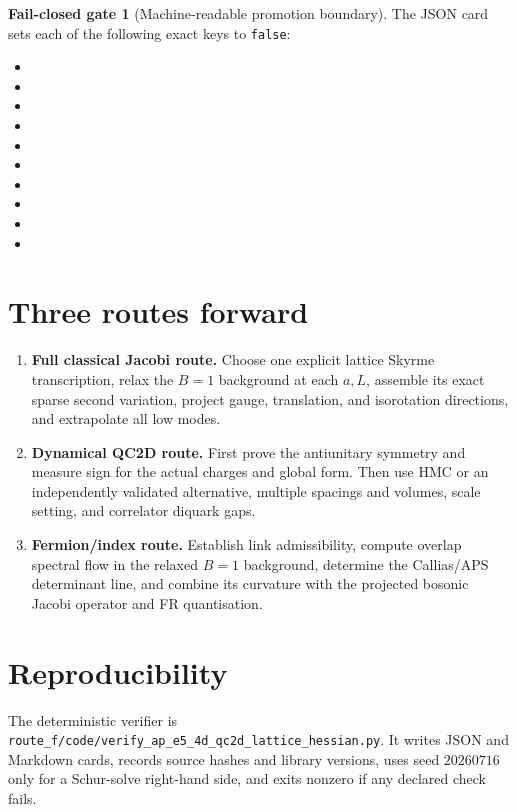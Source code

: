 \documentclass[11pt]{article}
\theoremstyle{definition}
\newtheorem{gate}[proposition]{Fail-closed gate}
\theoremstyle{remark}
\begin{document}
\begin{gate}[Machine-readable promotion boundary]
The JSON card sets each of the following exact keys to \texttt{false}:
\begin{itemize}[leftmargin=1.2em,itemsep=0pt,topsep=2pt]
\item {}
\item {}
\item {}
\item {}
\item {}
\item {}
\item {}
\item {}
\item {}
\item {}
\end{itemize}
\end{gate}

\section{Three routes forward}

\begin{enumerate}[label=(R\arabic*)]
\item \textbf{Full classical Jacobi route.}
Choose one explicit lattice Skyrme transcription, relax the \(B=1\)
background at each \(a,L\), assemble its exact sparse second variation,
project gauge, translation, and isorotation directions, and extrapolate all
low modes.
\item \textbf{Dynamical QC2D route.}
First prove the antiunitary symmetry and measure sign for the actual charges
and global form.  Then use HMC or an independently validated alternative,
multiple spacings and volumes, scale setting, and correlator diquark gaps.
\item \textbf{Fermion/index route.}
Establish link admissibility, compute overlap spectral flow in the relaxed
\(B=1\) background, determine the Callias/APS determinant line, and combine
its curvature with the projected bosonic Jacobi operator and FR quantisation.
\end{enumerate}

\section{Reproducibility}

The deterministic verifier is
\texttt{route\_f/code/verify\_ap\_e5\_4d\_qc2d\_lattice\_hessian.py}.
It writes JSON and Markdown cards, records source hashes and library versions,
uses seed \(20260716\) only for a Schur-solve right-hand side, and exits
nonzero if any declared check fails.



\end{document}
